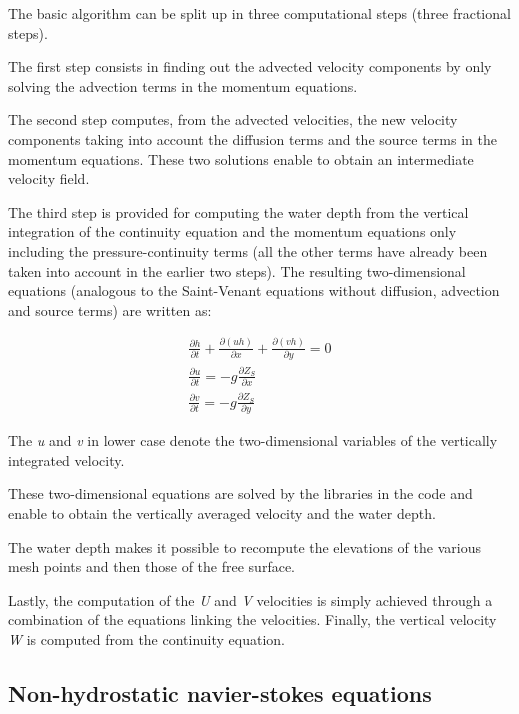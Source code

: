 The  basic algorithm can be split up in three computational steps
(three fractional steps).

The first step consists in finding out the advected velocity components by
only solving the advection terms in the momentum equations.

The second step computes, from the advected velocities, the new velocity
components taking into account the diffusion terms and the source terms in the
momentum equations. These two solutions enable to obtain an intermediate
velocity field.

The third step is provided for computing the water depth from the vertical
integration of the continuity equation and the momentum equations only
including the pressure-continuity terms (all the other terms have already been
taken into account in the earlier two steps). The resulting two-dimensional
equations (analogous to the Saint-Venant equations without diffusion, advection
and source terms) are written as:

\begin{subequations}
\begin{align}
\frac{\partial h}{\partial t} +\frac{\partial \left(uh\right)}{\partial x}
+\frac{\partial \left(vh\right)}{\partial y} =0
\\
\frac{\partial u}{\partial t} =-g\frac{\partial Z_{S} }{\partial x}
\\
\frac{\partial v}{\partial t} =-g\frac{\partial Z_{S} }{\partial y}
\end{align}
\end{subequations}

The \textit{u} and \textit{v} in lower case denote the two-dimensional
variables of the vertically integrated velocity.

These two-dimensional equations are solved by the libraries in the 
code and enable to obtain the vertically averaged velocity and the water depth.

The water depth makes it possible to recompute the elevations of the various
mesh points and then those of the free surface.

Lastly, the computation of the \textit{U} and \textit{V} velocities is simply achieved
through a combination of the equations linking the velocities. Finally, the
vertical velocity \textit{W} is computed from the continuity equation.

\subsection{Non-hydrostatic navier-stokes equations}


